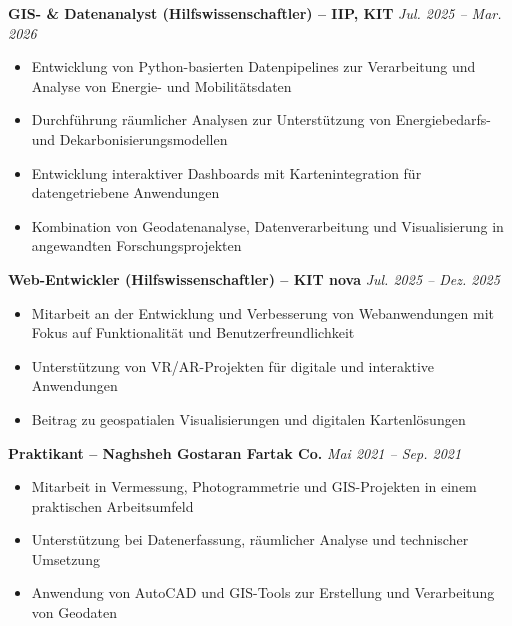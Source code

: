 \documentclass[a4paper,10pt]{article}
\begin{document}
\textbf{GIS- \& Datenanalyst (Hilfswissenschaftler) -- IIP, KIT} \hfill \textit{Jul. 2025 -- Mar. 2026}\\
\begin{itemize}[leftmargin=1.5em, noitemsep]
    \item Entwicklung von Python-basierten Datenpipelines zur Verarbeitung und Analyse von Energie- und Mobilitätsdaten
    \item Durchführung räumlicher Analysen zur Unterstützung von Energiebedarfs- und Dekarbonisierungsmodellen
    \item Entwicklung interaktiver Dashboards mit Kartenintegration für datengetriebene Anwendungen
    \item Kombination von Geodatenanalyse, Datenverarbeitung und Visualisierung in angewandten Forschungsprojekten
\end{itemize}

\vspace{0.4em}

\textbf{Web-Entwickler (Hilfswissenschaftler) -- KIT nova} \hfill \textit{Jul. 2025 -- Dez. 2025}\\
\begin{itemize}[leftmargin=1.5em, noitemsep]
    \item Mitarbeit an der Entwicklung und Verbesserung von Webanwendungen mit Fokus auf Funktionalität und Benutzerfreundlichkeit
    \item Unterstützung von VR/AR-Projekten für digitale und interaktive Anwendungen
    \item Beitrag zu geospatialen Visualisierungen und digitalen Kartenlösungen
\end{itemize}

\vspace{0.4em}

\textbf{Praktikant -- Naghsheh Gostaran Fartak Co.} \hfill \textit{Mai 2021 -- Sep. 2021}\\
\begin{itemize}[leftmargin=1.5em, noitemsep]
    \item Mitarbeit in Vermessung, Photogrammetrie und GIS-Projekten in einem praktischen Arbeitsumfeld
    \item Unterstützung bei Datenerfassung, räumlicher Analyse und technischer Umsetzung
    \item Anwendung von AutoCAD und GIS-Tools zur Erstellung und Verarbeitung von Geodaten
\end{itemize}

\end{document}
